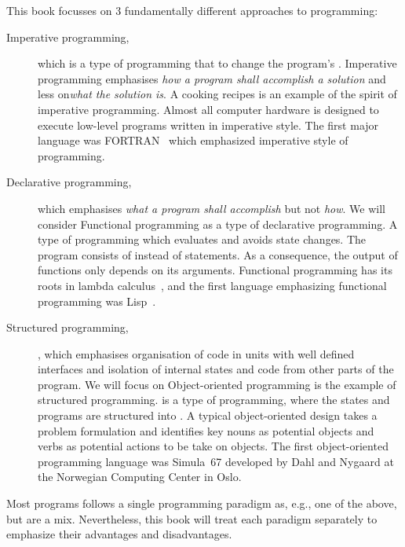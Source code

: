 This book focusses on 3 fundamentally different approaches to programming: 
\begin{description}
\item[Imperative programming,] which is a type of programming that  to change the program's . Imperative programming emphasises \emph{how a program shall accomplish a solution} and less on\emph{what the solution is}. A cooking recipes is an example of the spirit of imperative programming. Almost all computer hardware is designed to execute low-level programs written in imperative style. The first major language was FORTRAN~\cite{backus54} which emphasized imperative style of programming.
\item[Declarative programming,] which emphasises \emph{what a program shall accomplish} but not \emph{how}. We will consider Functional programming as a type of declarative programming.  A type of programming which evaluates  and avoids state changes. The program consists of  instead of statements. As a consequence, the output of functions only depends on its arguments. Functional programming has its roots in lambda calculus~\cite{church32}, and the first language emphasizing functional programming was Lisp~\cite{mccarthy60}. 
\item[Structured programming,], which emphasises organisation of code in units with well defined interfaces and isolation of internal states and code from other parts of the program. We will focus on Object-oriented programming is the example of structured programming.  is a type of programming, where the states and programs are structured into . A typical object-oriented design takes a problem formulation and identifies key nouns as potential objects and verbs as potential actions to be take on objects. The first object-oriented programming language was Simula~67 developed by Dahl and Nygaard at the Norwegian Computing Center in Oslo.
\end{description}
Most programs follows a single programming paradigm as, e.g., one of the above, but are a mix. Nevertheless, this book will treat each paradigm separately to emphasize their advantages and disadvantages.

